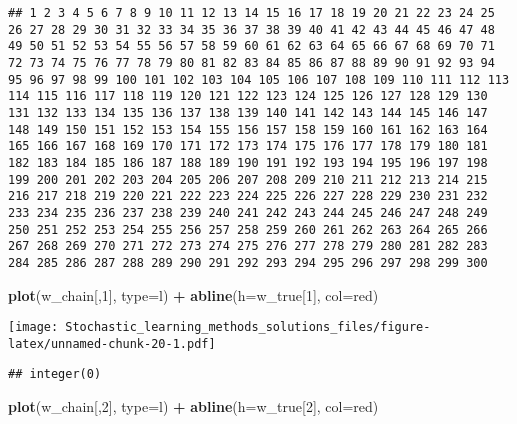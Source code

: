 \documentclass[
]{article}
\newenvironment{Shaded}{\begin{snugshade}}{\end{snugshade}}
\newcommand{\DataTypeTok}[1]{\textcolor[rgb]{0.13,0.29,0.53}{#1}}
\newcommand{\DecValTok}[1]{\textcolor[rgb]{0.00,0.00,0.81}{#1}}
\newcommand{\KeywordTok}[1]{\textcolor[rgb]{0.13,0.29,0.53}{\textbf{#1}}}
\newcommand{\NormalTok}[1]{#1}
\newcommand{\OperatorTok}[1]{\textcolor[rgb]{0.81,0.36,0.00}{\textbf{#1}}}
\newcommand{\StringTok}[1]{\textcolor[rgb]{0.31,0.60,0.02}{#1}}
\begin{document}
\begin{verbatim}
## 1 2 3 4 5 6 7 8 9 10 11 12 13 14 15 16 17 18 19 20 21 22 23 24 25 26 27 28 29 30 31 32 33 34 35 36 37 38 39 40 41 42 43 44 45 46 47 48 49 50 51 52 53 54 55 56 57 58 59 60 61 62 63 64 65 66 67 68 69 70 71 72 73 74 75 76 77 78 79 80 81 82 83 84 85 86 87 88 89 90 91 92 93 94 95 96 97 98 99 100 101 102 103 104 105 106 107 108 109 110 111 112 113 114 115 116 117 118 119 120 121 122 123 124 125 126 127 128 129 130 131 132 133 134 135 136 137 138 139 140 141 142 143 144 145 146 147 148 149 150 151 152 153 154 155 156 157 158 159 160 161 162 163 164 165 166 167 168 169 170 171 172 173 174 175 176 177 178 179 180 181 182 183 184 185 186 187 188 189 190 191 192 193 194 195 196 197 198 199 200 201 202 203 204 205 206 207 208 209 210 211 212 213 214 215 216 217 218 219 220 221 222 223 224 225 226 227 228 229 230 231 232 233 234 235 236 237 238 239 240 241 242 243 244 245 246 247 248 249 250 251 252 253 254 255 256 257 258 259 260 261 262 263 264 265 266 267 268 269 270 271 272 273 274 275 276 277 278 279 280 281 282 283 284 285 286 287 288 289 290 291 292 293 294 295 296 297 298 299 300
\end{verbatim}

\begin{Shaded}
\begin{Highlighting}[]
\KeywordTok{plot}\NormalTok{(w\_chain[,}\DecValTok{1}\NormalTok{], }\DataTypeTok{type=}\StringTok{\textquotesingle{}l\textquotesingle{}}\NormalTok{) }\OperatorTok{+}
\KeywordTok{abline}\NormalTok{(}\DataTypeTok{h=}\NormalTok{w\_true[}\DecValTok{1}\NormalTok{], }\DataTypeTok{col=}\StringTok{\textquotesingle{}red\textquotesingle{}}\NormalTok{)}
\end{Highlighting}
\end{Shaded}

\texttt{[image: Stochastic\_learning\_methods\_solutions\_files/figure-latex/unnamed-chunk-20-1.pdf]}

\begin{verbatim}
## integer(0)
\end{verbatim}

\begin{Shaded}
\begin{Highlighting}[]
\KeywordTok{plot}\NormalTok{(w\_chain[,}\DecValTok{2}\NormalTok{], }\DataTypeTok{type=}\StringTok{\textquotesingle{}l\textquotesingle{}}\NormalTok{) }\OperatorTok{+}
\KeywordTok{abline}\NormalTok{(}\DataTypeTok{h=}\NormalTok{w\_true[}\DecValTok{2}\NormalTok{], }\DataTypeTok{col=}\StringTok{\textquotesingle{}red\textquotesingle{}}\NormalTok{)}
\end{Highlighting}
\end{Shaded}
\end{document}
